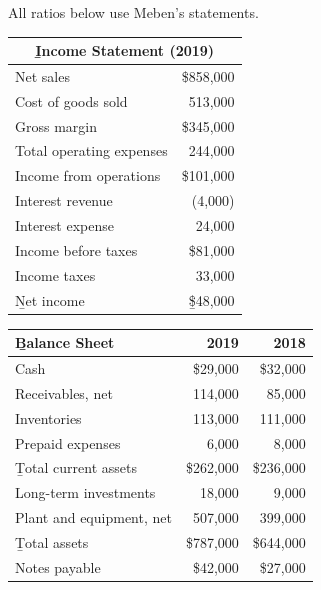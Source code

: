 \begin{example}
    All ratios below use Meben's statements.
    \begin{center}
    \small
    \begin{minipage}[t]{0.44\linewidth}\centering
        \begin{tabular}[t]{lr}
            \toprule
            \multicolumn{2}{c}{\b{Income Statement (2019)}} \\
            \midrule
            Net sales & \$858,000 \\
            Cost of goods sold & 513,000 \\
            Gross margin & \$345,000 \\
            Total operating expenses & 244,000 \\
            Income from operations & \$101,000 \\
            Interest revenue & (4,000) \\
            Interest expense & 24,000 \\
            Income before taxes & \$81,000 \\
            Income taxes & 33,000 \\
            \b{Net income} & \b{\$48,000} \\
            \bottomrule
        \end{tabular}
    \end{minipage}
    \hfill
    \begin{minipage}[t]{0.53\linewidth}\centering
        \begin{tabular}[t]{lrr}
            \toprule
            \b{Balance Sheet} & 2019 & 2018 \\
            \midrule
            Cash & \$29,000 & \$32,000 \\
            Receivables, net & 114,000 & 85,000 \\
            Inventories & 113,000 & 111,000 \\
            Prepaid expenses & 6,000 & 8,000 \\
            \b{Total current assets} & \$262,000 & \$236,000 \\
            Long-term investments & 18,000 & 9,000 \\
            Plant and equipment, net & 507,000 & 399,000 \\
            \b{Total assets} & \$787,000 & \$644,000 \\
            \midrule
            Notes payable & \$42,000 & \$27,000 \\

\end{tabular}
\end{minipage}
\end{center}
\end{example}
